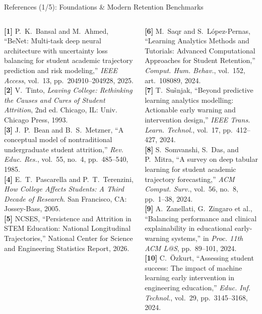 \documentclass{beamer}
\begin{document}
\begin{frame}[t]{References (1/5): Foundations \& Modern Retention Benchmarks}
  \begin{columns}[T]
    \fontsize{5.2pt}{6.4pt}\selectfont
    \textbf{[1]} P.~K.~Bansal and M.~Ahmed, ``BeNet: Multi-task deep neural architecture with uncertainty loss balancing for student academic trajectory prediction and risk modeling,'' \textit{IEEE Access}, vol.~13, pp.~204910--204928, 2025.\\[4pt]
    \textbf{[2]} V.~Tinto, \textit{Leaving College: Rethinking the Causes and Cures of Student Attrition}, 2nd ed. Chicago, IL: Univ. Chicago Press, 1993.\\[4pt]
    \textbf{[3]} J.~P.~Bean and B.~S.~Metzner, ``A conceptual model of nontraditional undergraduate student attrition,'' \textit{Rev. Educ. Res.}, vol.~55, no.~4, pp.~485--540, 1985.\\[4pt]
    \textbf{[4]} E.~T.~Pascarella and P.~T.~Terenzini, \textit{How College Affects Students: A Third Decade of Research}. San Francisco, CA: Jossey-Bass, 2005.\\[4pt]
    \textbf{[5]} NCSES, ``Persistence and Attrition in STEM Education: National Longitudinal Trajectories,'' National Center for Science and Engineering Statistics Report, 2026.

    \fontsize{5.2pt}{6.4pt}\selectfont
    \textbf{[6]} M.~Saqr and S.~L{\'o}pez-Pernas, ``Learning Analytics Methods and Tutorials: Advanced Computational Approaches for Student Retention,'' \textit{Comput. Hum. Behav.}, vol.~152, art.~108089, 2024.\\[4pt]
    \textbf{[7]} T.~Su{\v{s}}njak, ``Beyond predictive learning analytics modelling: Actionable early warning and intervention design,'' \textit{IEEE Trans. Learn. Technol.}, vol.~17, pp.~412--427, 2024.\\[4pt]
    \textbf{[8]} S.~Somvanshi, S.~Das, and P.~Mitra, ``A survey on deep tabular learning for student academic trajectory forecasting,'' \textit{ACM Comput. Surv.}, vol.~56, no.~8, pp.~1--38, 2024.\\[4pt]
    \textbf{[9]} A.~Zanellati, G.~Zingaro et al., ``Balancing performance and clinical explainability in educational early-warning systems,'' in \textit{Proc. 11th ACM L@S}, pp.~89--101, 2024.\\[4pt]
    \textbf{[10]} C.~{\"O}zkurt, ``Assessing student success: The impact of machine learning early intervention in engineering education,'' \textit{Educ. Inf. Technol.}, vol.~29, pp.~3145--3168, 2024.
  \end{columns}
\end{frame}
\end{document}

